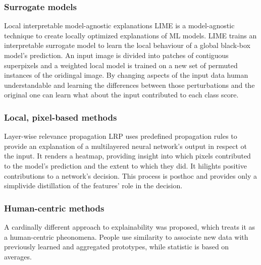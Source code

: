 		\subsubsection{Surrogate models}
		Local interpretable model-agnostic explanations LIME is a model-agnostic technique to create locally optimized explanations of ML models.
		LIME trains an interpretable surrogate model to learn the local behaviour of a global black-box model's prediction.
		An input image is divided into patches of contiguous superpixels and a weighted local model is trained on a new set of permuted instances of the oridingal image.
		By changing aspects of the input data human understandable and learning the differences between those perturbations and the original one can learn what about the input contributed to each class score.

		\subsubsection{Local, pixel-based methods}
		Layer-wise relevance propagation LRP uses predefined propagation rules to provide an explanation of a multilayered neural network's output in respect ot the input.
		It renders a heatmap, providing insight into which pixels contributed to the model's prediction and the extent to which they did.
		It hilights positive contributions to a network's decision.
		This process is posthoc and provides only a simplivide distillation of the features' role in the decision.

		\subsubsection{Human-centric methods}
		A cardinally different approach to explainability was proposed, which treats it as a human-centric pheonomena.
		People use similarity to associate new data with previously learned and aggregated prototypes, while statistic is based on averages.
